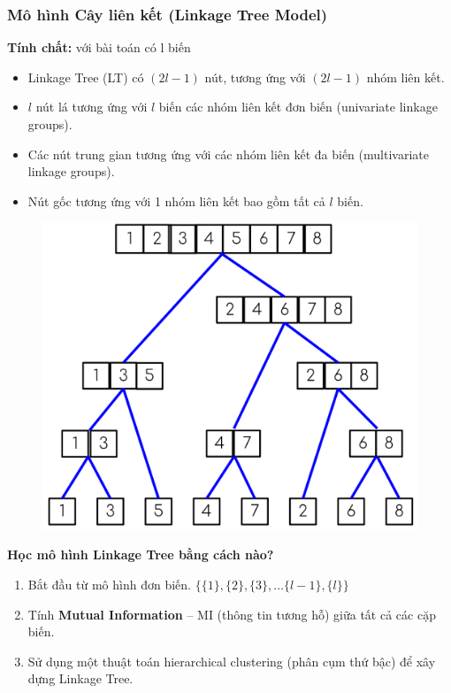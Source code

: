 \documentclass{book}
\begin{document}
            \subsubsection{Mô hình Cây liên kết (Linkage Tree Model)}
            \textbf{Tính chất:} với bài toán có l biến
            \begin{itemize}
                \item Linkage Tree (LT) có $(2l-1)$ nút, tương ứng với $(2l-1)$ nhóm liên kết.
                \item $l$ nút lá tương ứng với $l$ biến  các nhóm liên kết đơn biến (univariate linkage groups).
                \item Các nút trung gian tương ứng với các nhóm liên kết đa biến (multivariate linkage groups).
                \item Nút gốc tương ứng với 1 nhóm liên kết bao gồm tất cả $l$ biến.
            \end{itemize}
            \begin{figure}[H]
                \centering
                \includegraphics[width=0.8\linewidth]{images/LK.png}
                \label{fig:LK}
            \end{figure}
            \textbf{Học mô hình Linkage Tree bằng cách nào?}
            \begin{enumerate}
                \item Bắt đầu từ mô hình đơn biến. $\{\{1\},\{2\},\{3\},\dots \{l-1\},\{l\}\}$
                \item Tính \textbf{Mutual Information} – MI (thông tin tương hỗ) giữa tất cả các cặp biến.
                \item Sử dụng một thuật toán hierarchical clustering (phân cụm thứ bậc) để xây dựng Linkage Tree.
    
            \end{enumerate}
\end{document}
